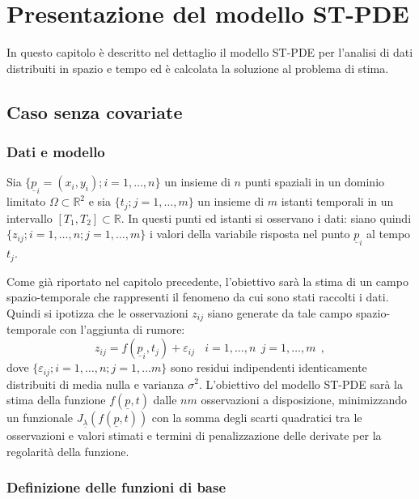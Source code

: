 \documentclass[a4paper,11pt,twoside,openright]{book}							%
\begin{document}
\chapter{Presentazione del modello ST-PDE}
\label{cap:modello}
In questo capitolo è descritto nel dettaglio il modello ST-PDE per l'analisi di dati distribuiti in spazio e tempo ed è calcolata la soluzione al problema di stima.


\section{Caso senza covariate}

\subsection{Dati e modello}

Sia $\{\underline p_i = (x_i,y_i); i=1, \ldots , n\}$ un insieme di $n$ punti spaziali in un dominio limitato $\Omega \subset \mathbb R^2$ e sia $\{t_j ; j=1, \ldots , m\}$ un insieme di $m$ istanti temporali in un intervallo $[T_1,T_2]\subset \mathbb R$. In questi punti ed istanti si osservano i dati: siano quindi $\{ z_{ij};i=1, \ldots , n; j=1, \ldots , m \}$ i valori della variabile risposta nel punto $\underline p_i$ al tempo $t_j$.

Come già riportato nel capitolo precedente, l'obiettivo sarà la stima di un campo spazio-temporale che rappresenti il fenomeno da cui sono stati raccolti i dati. Quindi si ipotizza che le osservazioni $z_{ij}$ siano generate da tale campo spazio-temporale con l'aggiunta di rumore:
\begin{equation}
\label{eq:modellobase}
z_{ij}=f(\underline p_i,t_j)+\varepsilon_{ij}\ \ \ \ i = 1,\ldots,n\ \ j=1,\ldots,m \ \ ,
\end{equation}
dove $\{ \varepsilon_{ij}; i = 1,\ldots ,n; j=1,\ldots m\}$ sono residui indipendenti identicamente distribuiti di media nulla e varianza $\sigma^2$. L'obiettivo del modello ST-PDE sarà la stima della funzione $f(\underline p,t)$ dalle $nm$ osservazioni a disposizione, minimizzando un funzionale $J_{\underline \lambda }(f(\underline p,t))$ con la somma degli scarti quadratici tra le osservazioni e valori stimati e termini di penalizzazione delle derivate per la regolarità della funzione.



\subsection{Definizione delle funzioni di base}
\label{subs:basi}
\end{document}
